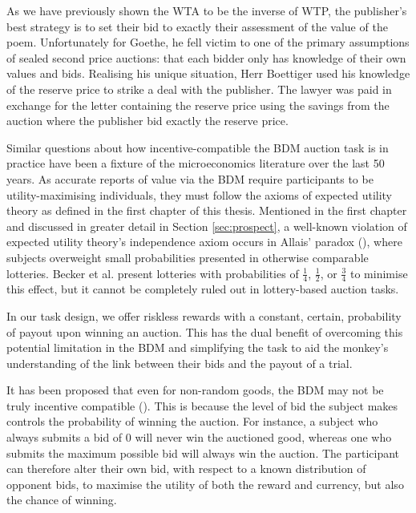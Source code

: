 As we have previously shown the WTA to be the inverse of WTP, the publisher’s best strategy is to set their bid to exactly their assessment of the value of the poem. Unfortunately for Goethe, he fell victim to one of the primary assumptions of sealed second price auctions: that each bidder only has knowledge of their own values and bids. Realising his unique situation, Herr Boettiger used his knowledge of the reserve price to strike a deal with the publisher. The lawyer was paid in exchange for the letter containing the reserve price using the savings from the auction where the publisher bid exactly the reserve price. 

Similar questions about how incentive-compatible the BDM auction task is in practice have been a fixture of the microeconomics literature over the last 50 years. As accurate reports of value via the BDM require participants to be utility-maximising individuals, they must follow the axioms of expected utility theory as defined in the first chapter of this thesis. Mentioned in the first chapter and discussed in greater detail in Section \ref{sec:prospect}, a well-known violation of expected utility theory’s independence axiom occurs in Allais’ paradox (\cite{allaisComportementLHommeRationnel1953}), where subjects overweight small probabilities presented in otherwise comparable lotteries. Becker et al. present lotteries with probabilities of $\frac{1}{4}$, $\frac{1}{2}$, or $\frac{3}{4}$ to minimise this effect, but it cannot be completely ruled out in lottery-based auction tasks.

In our task design, we offer riskless rewards with a constant, certain, probability of payout upon winning an auction. This has the dual benefit of overcoming this potential limitation in the BDM and simplifying the task to aid the monkey’s understanding of the link between their bids and the payout of a trial.

It has been proposed that even for non-random goods, the BDM may not be truly incentive compatible (\cite{horowitzBeckerDeGrootMarschakMechanismNot2006}). This is because the level of bid the subject makes controls the probability of winning the auction. For instance, a subject who always submits a bid of 0 will never win the auctioned good, whereas one who submits the maximum possible bid will always win the auction. The participant can therefore alter their own bid, with respect to a known distribution of opponent bids, to maximise the utility of both the reward and currency, but also the chance of winning.

